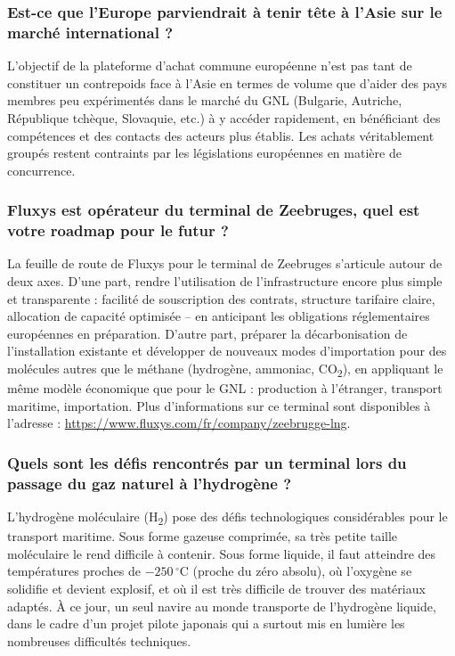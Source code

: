 \subsubsection{Est-ce que l'Europe parviendrait à tenir tête à l'Asie sur le marché international ?}

L'objectif de la plateforme d'achat commune européenne n'est pas tant de constituer un contrepoids face à l'Asie en termes de volume que d'aider des pays membres peu expérimentés dans le marché du GNL (Bulgarie, Autriche, République tchèque, Slovaquie, etc.) à y accéder rapidement, en bénéficiant des compétences et des contacts des acteurs plus établis. Les achats véritablement groupés restent contraints par les législations européennes en matière de concurrence.

\subsubsection{Fluxys est opérateur du terminal de Zeebruges, quel est votre roadmap pour le futur ?}

La feuille de route de Fluxys pour le terminal de Zeebruges s'articule autour de deux axes. D'une part, rendre l'utilisation de l'infrastructure encore plus simple et transparente : facilité de souscription des contrats, structure tarifaire claire, allocation de capacité optimisée -- en anticipant les obligations réglementaires européennes en préparation. D'autre part, préparer la décarbonisation de l'installation existante et développer de nouveaux modes d'importation pour des molécules autres que le méthane (hydrogène, ammoniac, CO\textsubscript{2}), en appliquant le même modèle économique que pour le GNL : production à l'étranger, transport maritime, importation. Plus d'informations sur ce terminal sont disponibles à l'adresse : \url{https://www.fluxys.com/fr/company/zeebrugge-lng}.

\subsubsection{Quels sont les défis rencontrés par un terminal lors du passage du gaz naturel à l'hydrogène ?}

L'hydrogène moléculaire (H\textsubscript{2}) pose des défis technologiques considérables pour le transport maritime. Sous forme gazeuse comprimée, sa très petite taille moléculaire le rend difficile à contenir. Sous forme liquide, il faut atteindre des températures proches de $-250\,^\circ$C (proche du zéro absolu), où l'oxygène se solidifie et devient explosif, et où il est très difficile de trouver des matériaux adaptés. À ce jour, un seul navire au monde transporte de l'hydrogène liquide, dans le cadre d'un projet pilote japonais qui a surtout mis en lumière les nombreuses difficultés techniques.


